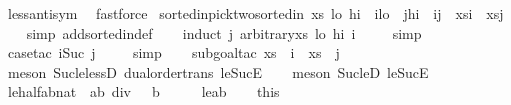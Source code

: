 \begin{isabellebody}
\ less{\isacharunderscore}antisym\ \isamarkupfalse%
\ fastforce%
\endisatagproof
{\isafoldproof}%
%
\isadelimproof
\isanewline
%
\endisadelimproof
\isanewline
{}\isamarkupfalse%
\ sorted{\isacharunderscore}in{\isacharunderscore}pick{\isacharunderscore}two{\isacharcolon}{\isachardoublequoteopen}sorted{\isacharunderscore}in\ xs\ lo\ hi\ {\isasymand}\ i{\isasymge}lo\ {\isasymand}\ j{\isasymle}hi\ {\isasymand}\ i{\isasymle}j\ {\isasymLongrightarrow}\ xs{\isacharbang}i\ {\isasymle}\ xs{\isacharbang}j{\isachardoublequoteclose}\isanewline
%
\isadelimproof
\ \ %
\endisadelimproof
%
\isatagproof
{}\isamarkupfalse%
\ {\isacharparenleft}simp\ add{\isacharcolon}sorted{\isacharunderscore}in{\isacharunderscore}def{\isacharparenright}\isanewline
\ \ \isamarkupfalse%
\ {\isacharparenleft}induct\ j\ arbitrary{\isacharcolon}xs\ lo\ hi\ i{\isacharparenright}\isanewline
\ \ \ \isamarkupfalse%
\ simp\isanewline
\ \ \isamarkupfalse%
\ {\isacharparenleft}case{\isacharunderscore}tac\ {\isachardoublequoteopen}i{\isacharequal}Suc\ j{\isachardoublequoteclose}{\isacharparenright}\isanewline
\ \ \ \isamarkupfalse%
\ simp\isanewline
\ \ \isamarkupfalse%
\ {\isacharparenleft}subgoal{\isacharunderscore}tac\ {\isachardoublequoteopen}xs\ {\isacharbang}\ i\ {\isasymle}\ xs\ {\isacharbang}\ j{\isachardoublequoteclose}{\isacharparenright}\isanewline
\ \ \isamarkupfalse%
\ {\isacharparenleft}meson\ Suc{\isacharunderscore}le{\isacharunderscore}lessD\ dual{\isacharunderscore}order{\isachardot}trans\ le{\isacharunderscore}SucE{\isacharparenright}\isanewline
\ \ \isamarkupfalse%
\ {\isacharparenleft}meson\ Suc{\isacharunderscore}leD\ le{\isacharunderscore}SucE{\isacharparenright}%
\endisatagproof
{\isafoldproof}%
%
\isadelimproof
\isanewline
%
\endisadelimproof
\isanewline
{}\isamarkupfalse%
\ le{\isacharunderscore}half{\isacharcolon}{\isachardoublequoteopen}a{\isacharless}{\isacharparenleft}b{\isacharcolon}{\isacharcolon}nat{\isacharparenright}\ {\isasymLongrightarrow}\ {\isacharparenleft}a{\isacharplus}b{\isacharparenright}\ div\ {}\ {\isacharless}\ b{\isachardoublequoteclose}\isanewline
%
\isadelimproof
%
\endisadelimproof
%
\isatagproof
{}\isamarkupfalse%
\ {\isacharminus}\isanewline
\ \ \isamarkupfalse%
\ le{\isacharcolon}{\isachardoublequoteopen}a{\isacharless}b{\isachardoublequoteclose}\isanewline
\ \ \isamarkupfalse%
\ this\ \isamarkupfalse%

\end{isabellebody}
